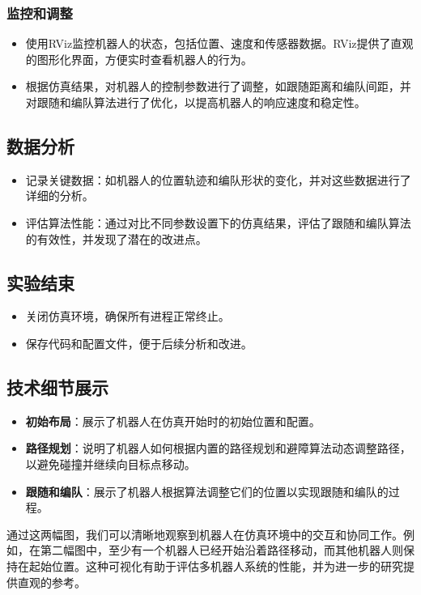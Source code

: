 \documentclass[journal,twoside,web]{ieeecolor}
\begin{document}
\subsubsection*{监控和调整}
\begin{itemize}
   \item 使用RViz监控机器人的状态，包括位置、速度和传感器数据。RViz提供了直观的图形化界面，方便实时查看机器人的行为。
   \item 根据仿真结果，对机器人的控制参数进行了调整，如跟随距离和编队间距，并对跟随和编队算法进行了优化，以提高机器人的响应速度和稳定性。
\end{itemize}
 
\subsection*{数据分析}
\begin{itemize}
   \item 记录关键数据：如机器人的位置轨迹和编队形状的变化，并对这些数据进行了详细的分析。
   \item 评估算法性能：通过对比不同参数设置下的仿真结果，评估了跟随和编队算法的有效性，并发现了潜在的改进点。
\end{itemize}
 
\subsection*{实验结束}
\begin{itemize}
   \item 关闭仿真环境，确保所有进程正常终止。
   \item 保存代码和配置文件，便于后续分析和改进。
\end{itemize}
 
\subsection*{技术细节展示}
\begin{itemize}
   \item \textbf{初始布局}：展示了机器人在仿真开始时的初始位置和配置。
   \item \textbf{路径规划}：说明了机器人如何根据内置的路径规划和避障算法动态调整路径，以避免碰撞并继续向目标点移动。
   \item \textbf{跟随和编队}：展示了机器人根据算法调整它们的位置以实现跟随和编队的过程。
\end{itemize}
 
通过这两幅图，我们可以清晰地观察到机器人在仿真环境中的交互和协同工作。例如，在第二幅图中，至少有一个机器人已经开始沿着路径移动，而其他机器人则保持在起始位置。这种可视化有助于评估多机器人系统的性能，并为进一步的研究提供直观的参考。
 
\end{document}
